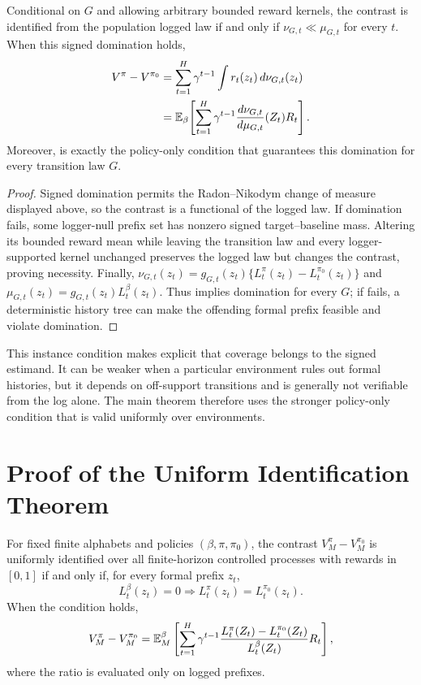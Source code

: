 \begin{proposition}
\label{prop:instancedomination}
Conditional on $G$ and allowing arbitrary bounded reward kernels, the contrast is identified from the population logged law if and only if
$\nu_{G,t}\ll\mu_{G,t}$ for every $t$. When this signed domination holds,
\begin{align*}
V^\pi-V^{\pi_0}
&=\sum_{t=1}^H\gamma^{t-1}
\int r_t(z_t)\,d\nu_{G,t}(z_t)\\
&=\mathbb{E}_\beta\!\left[\sum_{t=1}^H\gamma^{t-1}
\frac{d\nu_{G,t}}{d\mu_{G,t}}(Z_t)R_t\right].
\end{align*}
Moreover, \UCC is exactly the policy-only condition that guarantees this domination for every transition law $G$.
\end{proposition}
\begin{proof}
Signed domination permits the Radon--Nikodym change of measure displayed above, so the contrast is a functional of the logged law. If domination fails, some logger-null prefix set has nonzero signed target--baseline mass. Altering its bounded reward mean while leaving the transition law and every logger-supported kernel unchanged preserves the logged law but changes the contrast, proving necessity. Finally,
$\nu_{G,t}(z_t)=g_{G,t}(z_t)\{L_t^\pi(z_t)-L_t^{\pi_0}(z_t)\}$ and
$\mu_{G,t}(z_t)=g_{G,t}(z_t)L_t^\beta(z_t)$. Thus \UCC implies domination for every $G$; if \UCC fails, a deterministic history tree can make the offending formal prefix feasible and violate domination.
\end{proof}

This instance condition makes explicit that coverage belongs to the signed estimand. It can be weaker when a particular environment rules out formal histories, but it depends on off-support transitions and is generally not verifiable from the log alone. The main theorem therefore uses the stronger policy-only condition that is valid uniformly over environments.

\section{Proof of the Uniform Identification Theorem}

\begin{theorem}[Restated]
For fixed finite alphabets and policies $(\beta,\pi,\pi_0)$, the contrast $V_M^\pi-V_M^{\pi_0}$ is uniformly identified over all finite-horizon controlled processes with rewards in $[0,1]$ if and only if, for every formal prefix $z_t$,
\[
L_t^\beta(z_t)=0\Longrightarrow L_t^\pi(z_t)=L_t^{\pi_0}(z_t).
\]
When the condition holds,
\[
V_M^\pi-V_M^{\pi_0}
=\mathbb{E}_M^\beta\left[\sum_{t=1}^H\gamma^{t-1}
\frac{L_t^\pi(Z_t)-L_t^{\pi_0}(Z_t)}{L_t^\beta(Z_t)}R_t\right],
\]
where the ratio is evaluated only on logged prefixes.
\end{theorem}

